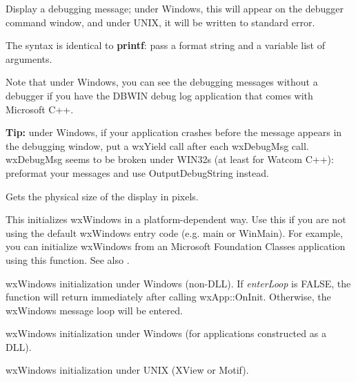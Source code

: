 
Display a debugging message; under Windows, this will appear on the
debugger command window, and under UNIX, it will be written to standard
error.

The syntax is identical to {\bf printf}: pass a format string and a
variable list of arguments.

Note that under Windows, you can see the debugging messages without a
debugger if you have the DBWIN debug log application that comes with
Microsoft C++.

{\bf Tip:} under Windows, if your application crashes before the
message appears in the debugging window, put a wxYield call after
each wxDebugMsg call. wxDebugMsg seems to be broken under WIN32s
(at least for Watcom C++): preformat your messages and use OutputDebugString
instead.



Gets the physical size of the display in pixels.

\label{wxentry}

This initializes wxWindows in a platform-dependent way. Use this if you
are not using the default wxWindows entry code (e.g. main or WinMain). For example,
you can initialize wxWindows from an Microsoft Foundation Classes application using
this function. See also .

 
wxWindows initialization under Windows (non-DLL). If {\it enterLoop} is FALSE, the
function will return immediately after calling wxApp::OnInit. Otherwise, the wxWindows
message loop will be entered.

 
wxWindows initialization under Windows (for applications constructed as a DLL).


wxWindows initialization under UNIX (XView or Motif).

